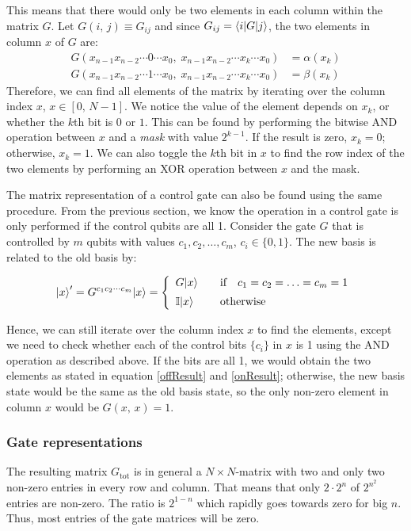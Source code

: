 \documentclass[bibliography=totocnumbered, 10pt]{article}
\theoremstyle{NoticeStyle}
\begin{document}
This means that there would only be two elements in each column within the matrix $G$. Let $G(i,\,j) \equiv G_{ij}$ and since $G_{ij} = {\left\langle{i}\right\vert} G {\left\vert{j}\right\rangle}$, the two elements in column $x$ of $G$ are:
\begin{align}
	G(x_{n-1}x_{n-2}\dotsm0\dotsm x_0,\;x_{n-1}x_{n-2}\dotsm x_k\dotsm x_0) &= \alpha(x_k)\label{offResult}\\ 
	G(x_{n-1}x_{n-2}\dotsm1\dotsm x_0,\;x_{n-1}x_{n-2}\dotsm x_k\dotsm x_0) &= \beta(x_k) \label{onResult}
\end{align}
Therefore, we can find all elements of the matrix by iterating over the column index $x$, $x \in [0,\,N-1]$. We notice the value of the element depends on $x_k$, or whether the $k$th bit is $0$ or $1$. This can be found by performing the bitwise AND operation between $x$ and a \emph{mask} with value $2^{k-1}$. If the result is zero, $x_k = 0$; otherwise, $x_k = 1$. We can also toggle the $k$th bit in $x$ to find the row index of the two elements by performing an XOR operation between $x$ and the mask.

The matrix representation of a control gate can also be found using the same procedure. From the previous section, we know the operation in a control gate is only performed if the control qubits are all 1. Consider the gate $G$ that is controlled by $m$ qubits with values $c_1, c_2, \dotsc, c_m$, $c_i \in \{0, 1\}$. The new basis is related to the old basis by:

\begin{align}
	{\left\vert{x}\right\rangle}' = G^{c_1c_2\dotsm c_m} {\left\vert{x}\right\rangle} = \left\{ 
	\begin{array}{ll}
		G{\left\vert{x}\right\rangle}  &  \quad\textrm{if}\quad c_1 = c_2 = \dotsc = c_m = 1\\[5pt]
		\mathbb{I}{\left\vert{x}\right\rangle} & \quad \textrm{otherwise}
	\end{array}
	\right.
\end{align}

Hence, we can still iterate over the column index $x$ to find the elements, except we need to check whether each of the control bits $\{c_i\}$ in $x$ is 1 using the AND operation as described above. If the bits are all 1, we would obtain the two elements as stated in equation \ref{offResult} and \ref{onResult}; otherwise, the new basis state would be the same as the old basis state, so the only non-zero element in column $x$ would be $G(x,\,x) = 1$.

\subsubsection{Gate representations}\label{sec:Gate representations}
The resulting matrix $G_\text{tot}$ is in general a $N \times N$-matrix with two and only two non-zero entries in every row and column. That means that only $2\cdot 2^n$ of $2^{n^2}$ entries are non-zero. The ratio is $2^{1-n}$ which rapidly goes towards zero for big $n$. Thus, most entries of the gate matrices will be zero.
\end{document}
